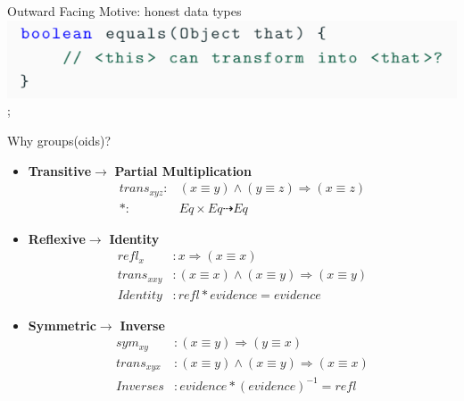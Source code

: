 \documentclass{beamer}
\begin{document}
\begin{frame}{Outward Facing Motive: honest data types}
{\includegraphics{equals.png}
};
\end{frame}


\begin{frame}{Why groups(oids)?}
\begin{itemize}
    \item \textbf{Transitive}$\to$ \textbf{Partial Multiplication}
    \begin{align*}
    trans_{xyz}:& (x\equiv y) \wedge (y\equiv z) \Rightarrow (x\equiv z)\\
    *:& Eq \times Eq \dashrightarrow Eq
    \end{align*}
\pause

\item  \textbf{Reflexive}$\to$ \textbf{Identity}
    \begin{align*}
    refl_x&: x \Rightarrow  (x\equiv x)\\
    trans_{xxy} &:(x\equiv x)\wedge (x\equiv y) \Rightarrow (x\equiv y)\\
    \hline
    Identity &: refl*evidence  = evidence
    \end{align*}

    
    \item  \textbf{Symmetric}$\to$ \textbf{Inverse}
    \begin{align*}
    sym_{xy}&:(x\equiv y)\Rightarrow (y\equiv x)\\
    trans_{xyx} &: (x\equiv y) \wedge (x\equiv y)  \Rightarrow (x\equiv x)\\
    \hline
    Inverses & : evidence * (evidence)^{-1}  = refl
    \end{align*}
\end{itemize}
\end{frame}
    
\end{document}

